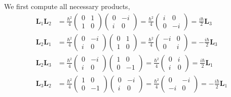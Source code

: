 \documentclass[../road-to-reality.tex]{subfiles}
\begin{document}
\begin{questions}
\begin{solution}
	We first compute all necessary products,
	\begin{align*}
		\mathbf{L}_1\mathbf{L}_2 &= \frac{\hbar^2}{4}\begin{pmatrix}0 & 1 \\ 1 & 0\end{pmatrix}\begin{pmatrix}0 & -i \\ i & 0\end{pmatrix} = \frac{\hbar^2}{4}\begin{pmatrix}i & 0 \\ 0 & -i\end{pmatrix} = \frac{i\hbar}{2}\mathbf{L}_3 \\
		\mathbf{L}_2\mathbf{L}_1 &= \frac{\hbar^2}{4}\begin{pmatrix}0 & -i \\ i & 0\end{pmatrix}\begin{pmatrix}0 & 1 \\ 1 & 0\end{pmatrix} = \frac{\hbar^2}{4}\begin{pmatrix}-i & 0 \\ 0 & i\end{pmatrix} = -\frac{i\hbar}{2}\mathbf{L}_3 \\
		\mathbf{L}_2\mathbf{L}_3 &= \frac{\hbar^2}{4}\begin{pmatrix}0 & -i \\ i & 0\end{pmatrix}\begin{pmatrix}1 & 0 \\ 0 & -1\end{pmatrix} = \frac{\hbar^2}{4}\begin{pmatrix}0 & i \\ i & 0\end{pmatrix} = \frac{i\hbar}{2}\mathbf{L}_1 \\
		\mathbf{L}_3\mathbf{L}_2 &= \frac{\hbar^2}{4}\begin{pmatrix}1 & 0 \\ 0 & -1\end{pmatrix}\begin{pmatrix}0 & -i \\ i & 0\end{pmatrix} = \frac{\hbar^2}{4}\begin{pmatrix}0 & -i \\ -i & 0\end{pmatrix} = {-\frac{i\hbar}{2}\mathbf{L}_1} \\

\end{align*}
\end{solution}
\end{questions}
\end{document}
